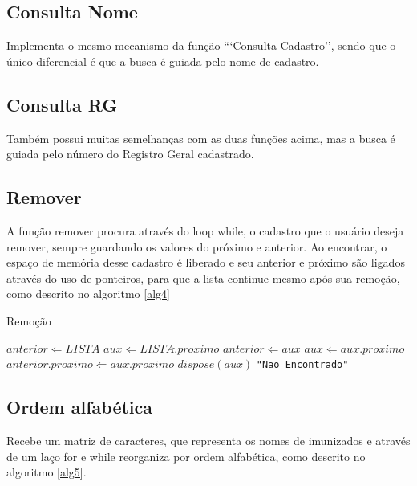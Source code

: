 \documentclass[12pt]{article}
\begin{document}
\subsection{Consulta Nome}

Implementa o mesmo mecanismo da função ```Consulta Cadastro'', sendo que o único diferencial
é que a busca é guiada pelo nome de cadastro.

\subsection{Consulta RG}

Também possui muitas semelhanças com as duas funções acima, mas a busca é guiada pelo número
do Registro Geral cadastrado.

\subsection{Remover}

A função remover procura através do loop while, o cadastro que o usuário deseja remover, sempre
guardando os valores do próximo e anterior. Ao encontrar, o espaço de memória desse cadastro é
liberado e seu anterior e próximo são ligados através do uso de ponteiros, para que a lista continue
mesmo após sua remoção, como descrito no algoritmo \ref{alg4}

\begin{algorithm}                      %
\caption{Remoção}          %
\label{alg4}                           %
\begin{algorithmic}                    %
    \STATE $anterior \Leftarrow LISTA$
    \STATE $aux \Leftarrow LISTA\hat.proximo$
        \STATE $anterior \Leftarrow aux$
        \STATE $aux \Leftarrow aux\hat.proximo$
    \ENDWHILE
      \STATE $anterior\hat.proximo \Leftarrow aux\hat.proximo$
      \STATE $dispose(aux)$
    \ELSE
      \PRINT \texttt{"Nao Encontrado"}
    \ENDIF
\end{algorithmic}
\end{algorithm}  

\subsection{Ordem alfabética}
Recebe um matriz de caracteres, que representa os nomes de imunizados e através de um laço for e while reorganiza por ordem
alfabética, como descrito no algoritmo \ref{alg5}.
\end{document}
